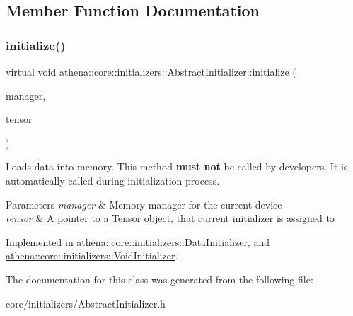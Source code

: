 \subsection{Member Function Documentation}
\mbox{\label{classathena_1_1core_1_1initializers_1_1_abstract_initializer_a9c0f0c57add306c9da8ffe8797532f62}} 
\subsubsection{\texorpdfstring{initialize()}{initialize()}}
{\footnotesize\ttfamily virtual void athena\+::core\+::initializers\+::\+Abstract\+Initializer\+::initialize (\begin{DoxyParamCaption}\item[{\mbox{\hyperlink{classathena_1_1backend_1_1_abstract_memory_manager}{athena\+::backend\+::\+Abstract\+Memory\+Manager}} $\ast$}]{manager,  }\item[{\mbox{\hyperlink{classathena_1_1core_1_1_tensor}{Tensor}} $\ast$}]{tensor }\end{DoxyParamCaption})\hspace{0.3cm}{\ttfamily [pure virtual]}}

Loads data into memory. This method {\bfseries must not} be called by developers. It is automatically called during initialization process. 
\begin{DoxyParams}{Parameters}
{\em manager} & Memory manager for the current device \\
\hline
{\em tensor} & A pointer to a \mbox{\hyperlink{classathena_1_1core_1_1_tensor}{Tensor}} object, that current initializer is assigned to \\
\hline
\end{DoxyParams}


Implemented in \mbox{\hyperlink{classathena_1_1core_1_1initializers_1_1_data_initializer_a984213526b2741e423f230098c71520a}{athena\+::core\+::initializers\+::\+Data\+Initializer}}, and \mbox{\hyperlink{classathena_1_1core_1_1initializers_1_1_void_initializer_adcb637175e8cad5841cb21e53e0e138f}{athena\+::core\+::initializers\+::\+Void\+Initializer}}.



The documentation for this class was generated from the following file\+:\begin{DoxyCompactItemize}
\item 
core/initializers/Abstract\+Initializer.\+h\end{DoxyCompactItemize}
